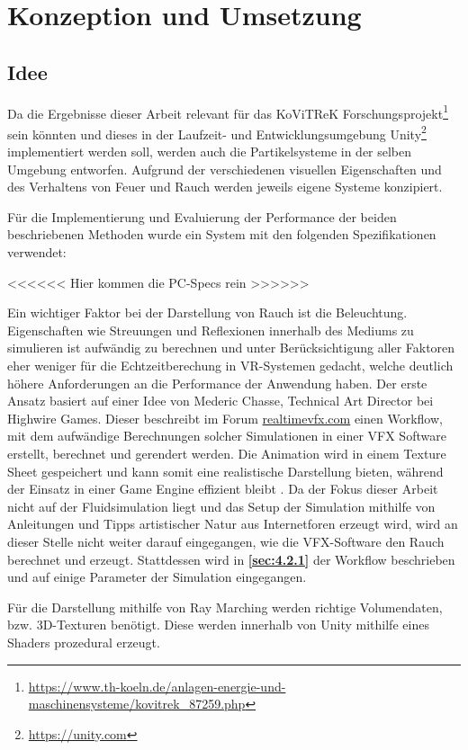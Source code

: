 \section{Konzeption und Umsetzung}
\label{sec:4}
\subsection{Idee}
\label{sec:4.1}

Da die Ergebnisse dieser Arbeit relevant für das KoViTReK Forschungsprojekt\footnote{\url{https://www.th-koeln.de/anlagen-energie-und-maschinensysteme/kovitrek\_87259.php}}
sein könnten und dieses in der Laufzeit- und Entwicklungsumgebung Unity\footnote{\url{https://unity.com}}
implementiert werden soll, werden auch die Partikelsysteme in der selben Umgebung entworfen.
Aufgrund der verschiedenen visuellen Eigenschaften und des Verhaltens von Feuer und Rauch werden jeweils eigene Systeme konzipiert.

Für die Implementierung und Evaluierung der Performance der beiden beschriebenen Methoden wurde ein System mit den folgenden Spezifikationen verwendet:

<<<<<< Hier kommen die PC-Specs rein >>>>>>

Ein wichtiger Faktor bei der Darstellung von Rauch ist die Beleuchtung. Eigenschaften wie Streuungen und Reflexionen innerhalb des Mediums zu simulieren ist
aufwändig zu berechnen und unter Berücksichtigung aller Faktoren eher weniger für die Echtzeitberechung in VR-Systemen gedacht, welche deutlich höhere Anforderungen an die Performance der Anwendung
haben. Der erste Ansatz basiert auf einer Idee von Mederic Chasse, Technical Art Director  bei Highwire Games.
Dieser beschreibt im Forum \href{realtimevfx.com}{realtimevfx.com} einen Workflow, mit dem aufwändige Berechnungen solcher Simulationen in einer VFX Software erstellt, berechnet und gerendert werden.
Die Animation wird in einem Texture Sheet gespeichert und kann somit eine realistische Darstellung bieten, während der Einsatz in einer Game Engine effizient bleibt \parencite{Chasse2018}.
Da der Fokus dieser Arbeit nicht auf der Fluidsimulation liegt und das Setup der Simulation mithilfe von Anleitungen
und Tipps artistischer Natur aus Internetforen erzeugt wird, wird an dieser Stelle nicht weiter darauf eingegangen, wie die VFX-Software den Rauch berechnet und erzeugt.
Stattdessen wird in \textbf{\autoref{sec:4.2.1}} der Workflow beschrieben und auf einige Parameter der Simulation eingegangen.

Für die Darstellung mithilfe von Ray Marching werden richtige Volumendaten, bzw. 3D-Texturen benötigt. Diese werden innerhalb von Unity
mithilfe eines Shaders prozedural erzeugt. 

